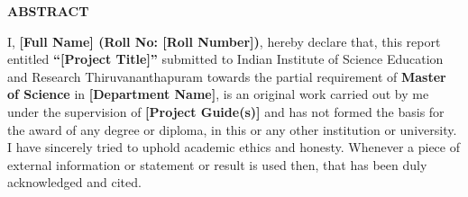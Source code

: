  \setcounter{page}{2}
\begin{center}
{\Large{\bf{ABSTRACT}}}
\end{center}

\noindent

I, \textbf{[Full Name] (Roll No: [Roll Number])}, hereby declare that, this report entitled \textbf{``[Project Title]”} submitted to Indian Institute of Science Education and Research Thiruvananthapuram towards the partial requirement of \textbf{Master of Science} in \textbf{[Department Name]}, is an original work carried out by me under the supervision of \textbf{[Project Guide(s)]} and has not formed the basis for the award of any degree or diploma, in this or any other institution or university. I have sincerely tried to uphold academic ethics and honesty. Whenever a piece of external information or statement or result is used then, that has been duly acknowledged and cited.

\clearpage